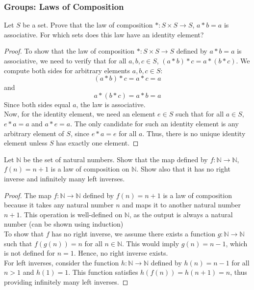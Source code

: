 \documentclass[openany]{book}
\begin{document}
\subsubsection{Groups: Laws of Composition}
\begin{exercise}
    Let $S$ be a set. Prove that the law of composition $*: S \times S \to S$, $a * b = a$ is associative. For which sets does this law have an identity element?
\end{exercise}
\begin{proof}
    To show that the law of composition $*: S \times S \to S$ defined by $a * b = a$ is associative, we need to verify that for all $a, b, c \in S$, $(a * b) * c = a * (b * c)$.
    We compute both sides for arbitrary elements $a, b, c \in S$:
    $$(a * b) * c = a * c = a$$
    and
    $$a * (b * c) = a * b = a$$
    Since both sides equal $a$, the law is associative. \\
    Now, for the identity element, we need an element $e \in S$ such that for all $a \in S$, $e * a = a$ and $a * e = a$. The only candidate for such an identity element is any arbitrary element of $S$, since $e * a = e$ for all $a$. Thus, there is no unique identity element unless $S$ has exactly one element.
\end{proof}
\begin{exercise}
    Let $\mathbb{N}$ be the set of natural numbers. Show that the map defined by $f: \mathbb{N} \to \mathbb{N}$, $f(n) = n + 1$ is a law of composition on $\mathbb{N}$. Show also that it has no right inverse and infinitely many left inverses.
\end{exercise}
\begin{proof}
    The map $f: \mathbb{N} \to \mathbb{N}$ defined by $f(n) = n + 1$ is a law of composition because it takes any natural number $n$ and maps it to another natural number $n + 1$. This operation is well-defined on $\mathbb{N}$, as the output is always a natural number (can be shown using induction)\\
    To show that $f$ has no right inverse, we assume there exists a function $g: \mathbb{N} \to \mathbb{N}$ such that $f(g(n)) = n$ for all $n \in \mathbb{N}$. This would imply $g(n) = n - 1$, which is not defined for $n = 1$. Hence, no right inverse exists. \\
    For left inverses, consider the function $h: \mathbb{N} \to \mathbb{N}$ defined by $h(n) = n - 1$ for all $n > 1$ and $h(1) = 1$. This function satisfies $h(f(n)) = h(n + 1) = n$, thus providing infinitely many left inverses.
\end{proof}
\end{document}
